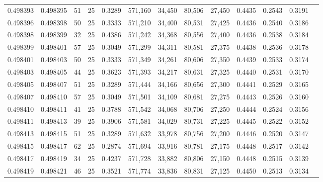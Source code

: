 \begin{tabular}{rrrrrrrrrrrrr}
0.498393 & 0.498395 &    51 &  25 &                                     0.3289 & 571,160 &  34,450 &  80,506 &  27,450 & 0.4435 & 0.2543 & 0.3191 \\
0.498396 & 0.498398 &    50 &  25 &                                     0.3333 & 571,210 &  34,400 &  80,531 &  27,425 & 0.4436 & 0.2540 & 0.3186 \\
0.498398 & 0.498399 &    32 &  25 &                                     0.4386 & 571,242 &  34,368 &  80,556 &  27,400 & 0.4436 & 0.2538 & 0.3184 \\
0.498399 & 0.498401 &    57 &  25 &                                     0.3049 & 571,299 &  34,311 &  80,581 &  27,375 & 0.4438 & 0.2536 & 0.3178 \\
0.498401 & 0.498403 &    50 &  25 &                                     0.3333 & 571,349 &  34,261 &  80,606 &  27,350 & 0.4439 & 0.2533 & 0.3174 \\
0.498403 & 0.498405 &    44 &  25 &                                     0.3623 & 571,393 &  34,217 &  80,631 &  27,325 & 0.4440 & 0.2531 & 0.3170 \\
0.498405 & 0.498407 &    51 &  25 &                                     0.3289 & 571,444 &  34,166 &  80,656 &  27,300 & 0.4441 & 0.2529 & 0.3165 \\
0.498407 & 0.498410 &    57 &  25 &                                     0.3049 & 571,501 &  34,109 &  80,681 &  27,275 & 0.4443 & 0.2526 & 0.3160 \\
0.498410 & 0.498411 &    41 &  25 &                                     0.3788 & 571,542 &  34,068 &  80,706 &  27,250 & 0.4444 & 0.2524 & 0.3156 \\
0.498411 & 0.498413 &    39 &  25 &                                     0.3906 & 571,581 &  34,029 &  80,731 &  27,225 & 0.4445 & 0.2522 & 0.3152 \\
0.498413 & 0.498415 &    51 &  25 &                                     0.3289 & 571,632 &  33,978 &  80,756 &  27,200 & 0.4446 & 0.2520 & 0.3147 \\
0.498415 & 0.498417 &    62 &  25 &                                     0.2874 & 571,694 &  33,916 &  80,781 &  27,175 & 0.4448 & 0.2517 & 0.3142 \\
0.498417 & 0.498419 &    34 &  25 &                                     0.4237 & 571,728 &  33,882 &  80,806 &  27,150 & 0.4448 & 0.2515 & 0.3139 \\
0.498419 & 0.498421 &    46 &  25 &                                     0.3521 & 571,774 &  33,836 &  80,831 &  27,125 & 0.4450 & 0.2513 & 0.3134 \\

\end{tabular}

